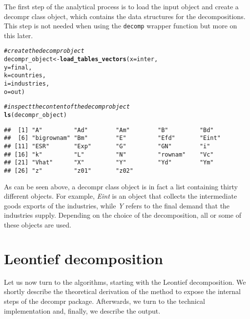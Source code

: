 \documentclass[a4paper]{article}\usepackage[]{graphicx}\usepackage[]{color}
\makeatletter
\newcommand{\hlcom}[1]{\textcolor[rgb]{0.678,0.584,0.686}{\textit{#1}}}%
\newcommand{\hlstd}[1]{\textcolor[rgb]{0.345,0.345,0.345}{#1}}%
\newcommand{\hlkwb}[1]{\textcolor[rgb]{0.69,0.353,0.396}{#1}}%
\newcommand{\hlkwc}[1]{\textcolor[rgb]{0.333,0.667,0.333}{#1}}%
\newcommand{\hlkwd}[1]{\textcolor[rgb]{0.737,0.353,0.396}{\textbf{#1}}}%
\newenvironment{kframe}{%
 \def\at@end@of@kframe{}%
 \ifinner\ifhmode%
  \def\at@end@of@kframe{\end{minipage}}%
  \begin{minipage}{\columnwidth}%
 \fi\fi%
 \def\FrameCommand##1{\hskip\@totalleftmargin \hskip-\fboxsep
 \colorbox{shadecolor}{##1}\hskip-\fboxsep
     \hskip-\linewidth \hskip-\@totalleftmargin \hskip\columnwidth}%
 \MakeFramed {\advance\hsize-\width
   \@totalleftmargin\z@ \linewidth\hsize
   \@setminipage}}%
 {\par\unskip\endMakeFramed%
 \at@end@of@kframe}
\newenvironment{knitrout}{}{} %
\makeatother
\begin{document}
The first step of the analytical process is to load the input object and create a decompr class object, 
which contains the data structures for the decompositions.
This step is not needed when using the \verb!decomp! wrapper function but more on this later.

\begin{knitrout}
\color{fgcolor}\begin{kframe}
\begin{alltt}
\hlcom{# create the decompr object}
\hlstd{decompr_object} \hlkwb{<-} \hlkwd{load_tables_vectors}\hlstd{(} \hlkwc{x} \hlstd{= inter,}
                                       \hlkwc{y} \hlstd{= final,}
                                       \hlkwc{k} \hlstd{= countries,}
                                       \hlkwc{i} \hlstd{= industries,}
                                       \hlkwc{o} \hlstd{= out        )}

\hlcom{# inspect the content of the decompr object}
\hlkwd{ls}\hlstd{(decompr_object)}
\end{alltt}
\begin{verbatim}
##  [1] "A"         "Ad"        "Am"        "B"         "Bd"       
##  [6] "bigrownam" "Bm"        "E"         "Efd"       "Eint"     
## [11] "ESR"       "Exp"       "G"         "GN"        "i"        
## [16] "k"         "L"         "N"         "rownam"    "Vc"       
## [21] "Vhat"      "X"         "Y"         "Yd"        "Ym"       
## [26] "z"         "z01"       "z02"
\end{verbatim}
\end{kframe}
\end{knitrout}

As can be seen above, a decompr class object is in fact a list containing thirty different objects.
For example, \textit{Eint} is an object that collects the intermediate goods exports of the industries,
while \textit{Y} refers to the final demand that the industries supply.
Depending on the choice of the decomposition, all or some of these objects are used.


\section{Leontief decomposition}
\label{sec:leontief}
Let us now turn to the algorithms, starting with the Leontief decomposition. 
We shortly describe the theoretical derivation of the method to expose the internal steps of the decompr package. 
Afterwards, we turn to the technical implementation and, finally, we describe the output.
\end{document}
